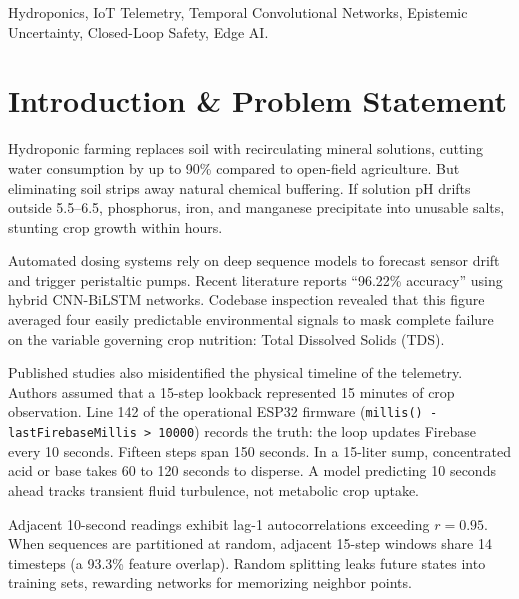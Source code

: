 \documentclass[conference]{IEEEtran}
\begin{document}
\begin{IEEEkeywords}
Hydroponics, IoT Telemetry, Temporal Convolutional Networks, Epistemic Uncertainty, Closed-Loop Safety, Edge AI.
\end{IEEEkeywords}

\section{Introduction \& Problem Statement}
Hydroponic farming replaces soil with recirculating mineral solutions, cutting water consumption by up to 90\% compared to open-field agriculture. But eliminating soil strips away natural chemical buffering. If solution pH drifts outside 5.5--6.5, phosphorus, iron, and manganese precipitate into unusable salts, stunting crop growth within hours.

Automated dosing systems rely on deep sequence models to forecast sensor drift and trigger peristaltic pumps. Recent literature reports ``96.22\% accuracy'' using hybrid CNN-BiLSTM networks. Codebase inspection revealed that this figure averaged four easily predictable environmental signals to mask complete failure on the variable governing crop nutrition: Total Dissolved Solids (TDS).

Published studies also misidentified the physical timeline of the telemetry. Authors assumed that a 15-step lookback represented 15 minutes of crop observation. Line 142 of the operational ESP32 firmware (\texttt{millis() - lastFirebaseMillis > 10000}) records the truth: the loop updates Firebase every 10 seconds. Fifteen steps span 150 seconds. In a 15-liter sump, concentrated acid or base takes 60 to 120 seconds to disperse. A model predicting 10 seconds ahead tracks transient fluid turbulence, not metabolic crop uptake.

Adjacent 10-second readings exhibit lag-1 autocorrelations exceeding $r = 0.95$. When sequences are partitioned at random, adjacent 15-step windows share 14 timesteps (a 93.3\% feature overlap). Random splitting leaks future states into training sets, rewarding networks for memorizing neighbor points.
\end{document}
